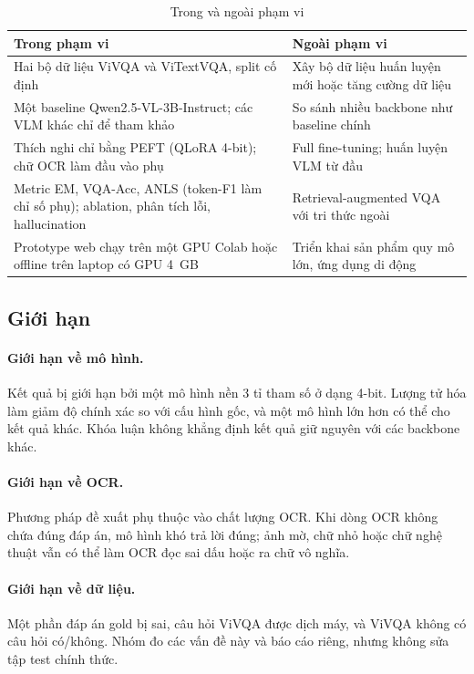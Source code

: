 \begin{table}[htbp]
\caption{Trong và ngoài phạm vi}
\label{tab:scope}
\centering
\small
\begin{tabular}{p{}p{}}
\toprule
\textbf{Trong phạm vi} & \textbf{Ngoài phạm vi} \\
\midrule
Hai bộ dữ liệu ViVQA và ViTextVQA, split cố định &
Xây bộ dữ liệu huấn luyện mới hoặc tăng cường dữ liệu \\
Một baseline Qwen2.5-VL-3B-Instruct; các VLM khác chỉ để tham khảo &
So sánh nhiều backbone như baseline chính \\
Thích nghi chỉ bằng PEFT (QLoRA 4-bit); chữ OCR làm đầu vào phụ &
Full fine-tuning; huấn luyện VLM từ đầu \\
Metric EM, VQA-Acc, ANLS (token-F1 làm chỉ số phụ); ablation, phân tích lỗi,
hallucination & Retrieval-augmented VQA với tri thức ngoài \\
Prototype web chạy trên một GPU Colab hoặc offline trên laptop có GPU 4~GB &
Triển khai sản phẩm quy mô lớn, ứng dụng di động \\
\bottomrule
\end{tabular}
\end{table}

\subsection{Giới hạn}

\paragraph{Giới hạn về mô hình.} Kết quả bị giới hạn bởi một mô hình nền 3 tỉ
tham số ở dạng 4-bit. Lượng tử hóa làm giảm độ chính xác so với cấu hình gốc, và
một mô hình lớn hơn có thể cho kết quả khác. Khóa luận không khẳng định kết quả
giữ nguyên với các backbone khác.

\paragraph{Giới hạn về OCR.} Phương pháp đề xuất phụ thuộc vào chất lượng OCR.
Khi dòng OCR không chứa đúng đáp án, mô hình khó trả lời đúng; ảnh mờ, chữ nhỏ
hoặc chữ nghệ thuật vẫn có thể làm OCR đọc sai dấu hoặc ra chữ vô nghĩa.

\paragraph{Giới hạn về dữ liệu.} Một phần đáp án gold bị sai, câu hỏi ViVQA được
dịch máy, và ViVQA không có câu hỏi có/không. Nhóm đo các vấn đề này và báo cáo
riêng, nhưng không sửa tập test chính thức.


